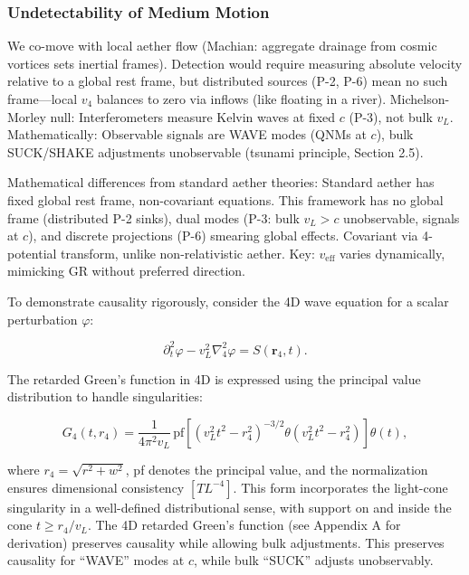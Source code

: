 \subsubsection{Undetectability of Medium Motion}

We co-move with local aether flow (Machian: aggregate drainage from cosmic vortices sets inertial frames). Detection would require measuring absolute velocity relative to a global rest frame, but distributed sources (P-2, P-6) mean no such frame---local $v_4$ balances to zero via inflows (like floating in a river). Michelson-Morley null: Interferometers measure Kelvin waves at fixed $c$ (P-3), not bulk $v_L$. Mathematically: Observable signals are WAVE modes (QNMs at $c$), bulk SUCK/SHAKE adjustments unobservable (tsunami principle, Section 2.5).

Mathematical differences from standard aether theories: Standard aether has fixed global rest frame, non-covariant equations. This framework has no global frame (distributed P-2 sinks), dual modes (P-3: bulk $v_L > c$ unobservable, signals at $c$), and discrete projections (P-6) smearing global effects. Covariant via 4-potential transform, unlike non-relativistic aether. Key: $v_{\text{eff}}$ varies dynamically, mimicking GR without preferred direction.

To demonstrate causality rigorously, consider the 4D wave equation for a scalar perturbation $\varphi$:

\begin{equation}
\partial_t^2 \varphi - v_L^2 \nabla_4^2 \varphi = S(\mathbf{r}_4, t).
\end{equation}

The retarded Green's function in 4D is expressed using the principal value distribution to handle singularities:

\begin{equation}
G_4(t, r_4) = \frac{1}{4 \pi^2 v_L} \, \text{pf} \left[ (v_L^2 t^2 - r_4^2)^{-3/2} \theta(v_L^2 t^2 - r_4^2) \right] \theta(t),
\end{equation}

where $r_4 = \sqrt{r^2 + w^2}$, pf denotes the principal value, and the normalization ensures dimensional consistency $[T L^{-4}]$. This form incorporates the light-cone singularity in a well-defined distributional sense, with support on and inside the cone $t \geq r_4 / v_L$. The 4D retarded Green's function (see Appendix A for derivation) preserves causality while allowing bulk adjustments. This preserves causality for ``WAVE'' modes at $c$, while bulk ``SUCK'' adjusts unobservably.


